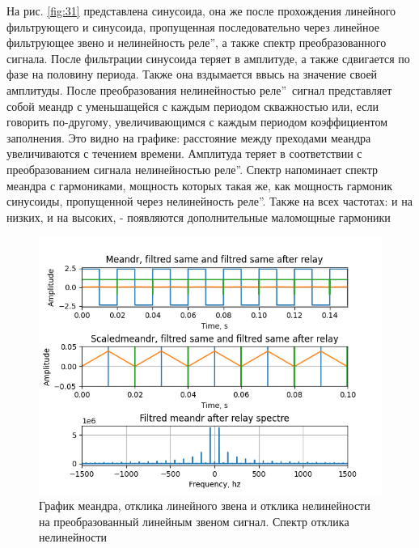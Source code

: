 На рис. \ref{fig:31} представлена синусоида, она же после прохождения
линейного фильтрующего и синусоида, пропущенная последовательно через линейное
фильтрующее звено и нелинейность  реле\textquotedblright,
а также спектр преобразованного сигнала. После фильтрации синусоида теряет в амплитуде,
а также сдвигается по фазе на половину периода. Также она вздымается ввысь на значение
своей амплитуды. После преобразования нелинейностью
 реле\textquotedblright\ сигнал представляет собой меандр
с уменьшащейся с каждым периодом скважностью или, если говорить по-другому,
увеличивающимся с каждым периодом коэффициентом заполнения. Это видно на графике:
расстояние между преходами меандра увеличиваются с течением времени. 
Амплитуда теряет в соответствии с преобразованием сигнала нелинейностью
 реле\textquotedblright. Спектр
напоминает спектр меандра с гармониками, мощность которых такая же, как мощность
гармоник синусоиды, пропущенной через нелинейность
 реле\textquotedblright. Также на всех частотах: и на
низких, и на высоких, - появляются дополнительные маломощные гармоники

\begin{figure}[H]
	\centering
	\includegraphics[width=1.05\linewidth]{body/images/filtred-meandr-after-relay-and-its-spectre.png}
	\caption{График меандра, отклика линейного звена и отклика нелинейности на преобразованный
	линейным звеном сигнал. Спектр отклика нелинейности}
	\label{fig:32}
\end{figure}

